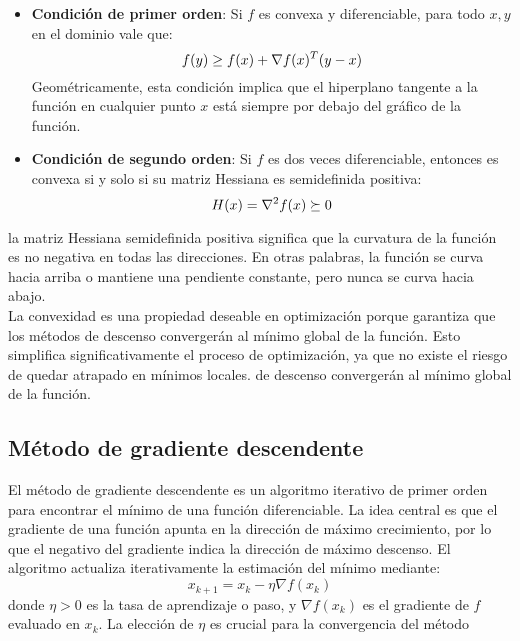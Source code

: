 \documentclass{tp02}
\begin{document}
\begin{itemize}
    \item \textbf{Condición de primer orden}: Si $f$ es convexa y diferenciable,  para todo $x,y$ en el dominio vale que: 
    \begin{equation}
    \centering
    f(y) \geq f(x) + \nabla f(x)^T(y-x)
    \end{equation}
Geométricamente, esta condición implica que el hiperplano tangente a la función en 
cualquier punto $x$ está siempre por debajo del gráfico de la función. \\

    \item \textbf{Condición de segundo orden}: Si $f$ es dos veces diferenciable, entonces es convexa si y solo si su matriz Hessiana es semidefinida positiva:
    \begin{equation}
    \centering
    H(x) = \nabla^2f(x) \succeq 0
    \end{equation}
\end{itemize}
la matriz Hessiana 
semidefinida positiva significa que la curvatura de la función es no negativa en 
todas las direcciones. En otras palabras, la función se curva hacia arriba o 
mantiene una pendiente constante, pero nunca se curva hacia abajo.\\

La convexidad es una propiedad deseable en optimización porque garantiza que los métodos de descenso convergerán al mínimo global de la función. Esto simplifica significativamente el proceso de optimización, ya que no existe el riesgo de quedar atrapado en mínimos locales.
de descenso convergerán al mínimo global de la función. 

\subsection{Método de gradiente descendente}

El método de gradiente descendente es un algoritmo iterativo de primer orden para
encontrar el mínimo de una función diferenciable. La idea central es que el gradiente
de una función apunta en la dirección de máximo crecimiento, por lo que el negativo
del gradiente indica la dirección de máximo descenso.
El algoritmo actualiza iterativamente la estimación del mínimo mediante:
\begin{equation}
x_{k+1} = x_k - \eta \nabla f(x_k)
\end{equation}
donde $\eta > 0$ es la tasa de aprendizaje o paso, y $\nabla f(x_k)$ es el gradiente
de $f$ evaluado en $x_k$. La elección de $\eta$ es crucial para la convergencia del
método
\end{document}

